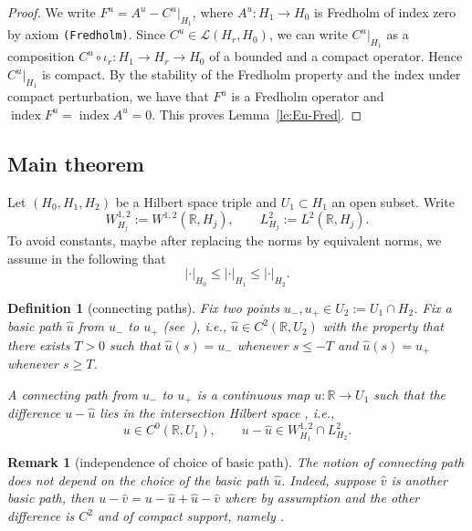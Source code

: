 \documentclass[pdftex]{sigma}
\numberwithin{equation}{section}
\newtheorem{Definition}[Theorem]{Definition}
\newtheorem{Remark}[Theorem]{Remark}
\newcommand{\R}{{\mathbb{R}}}
\newcommand{\Ll}{{\mathcal{L}}} %
\newcommand{\INDEX}{\mathop{\mathrm{index}}} %
\def\abs#1{\mathopen|#1\mathclose|}
\newcommand{\1}{{{\mathchoice {\rm 1\mskip-4mu l} {\rm 1\mskip-4mu l}
{\rm 1\mskip-4.5mu l} {\rm 1\mskip-5mu l}}}}
\begin{document}
\begin{proof}
We write $F^u=A^u-C^u|_{H_1}$, where $A^u\colon H_1\to H_0$ is Fredholm of
index zero by axiom \texttt{(Fredholm)}.
Since $C^u\in\Ll(H_r,H_0)$, we can write $C^u|_{H_1}$
as a composition $C^u\circ\iota_r\colon {H_1\to H_r\to H_0}$
of a bounded and a compact operator. Hence $C^u|_{H_1}$ is compact.
By the stability of the Fredholm property and the index
under compact perturbation, we have that
$F^u$ is a Fredholm operator and
$\INDEX F^u=\INDEX A^u=0$.
This proves Lemma~\ref{le:Eu-Fred}.
\end{proof}



\subsection{Main theorem}

Let $(H_0,H_1,H_2)$ be a Hilbert space triple and $U_1\subset H_1$ an
open subset. Write
\[
 W^{1,2}_{H_j}:=W^{1,2}(\R,H_j)
 ,\qquad
 L^2_{H_j}:=L^2(\R,H_j) .
\]
To avoid constants,
maybe after replacing the norms by equivalent norms,
we assume in the following that
\[
 \abs{\cdot}_{H_0}\le \abs{\cdot}_{H_1}\le \abs{\cdot}_{H_2}.
\]

\begin{Definition}[connecting paths]%
Fix two points $u_-,u_+\in U_2:=U_1\cap H_2$.
%
Fix a \textit{basic path} $\hat u$ from $u_-$ to $u_+$
(see~\cite{Frauenfelder:2025e}),
i.e., $\hat u\in C^2(\R,U_2)$ with the property that there exists $T>0$
such that $\hat u(s)=u_-$ whenever $s\le -T$ and
$\hat u(s)=u_+$ whenever $s\ge T$.

A \textit{connecting path from \boldmath$u_-$ to $u_+$}
is a continuous map $u\colon \R\to U_1$
such that the difference $u-\hat u$ lies in the intersection
Hilbert space , i.e.,
\begin{equation}\label{eq:connecting-paths}
 u\in C^0(\R,U_1)
 ,\qquad
 u-\hat u\in W^{1,2}_{H_1}\cap L^2_{H_2} .
\end{equation}
\end{Definition}

\begin{Remark}[independence of choice of basic path]
The notion of connecting path does not depend on the choice of
the basic path $\hat u$.
Indeed, suppose $\hat v$ is another basic path, then
$ u-\hat v
 =u-\hat u+\hat u-\hat v$
where  by assumption
and the other difference is $C^2$ and of compact support, namely
\smash{$\hat u-\hat v\in C^2_{\rm c}(\R,H_2)\subset W^{1,2}_{H_1}\cap L^2_{H_2}$}.
\end{Remark}
\end{document}
